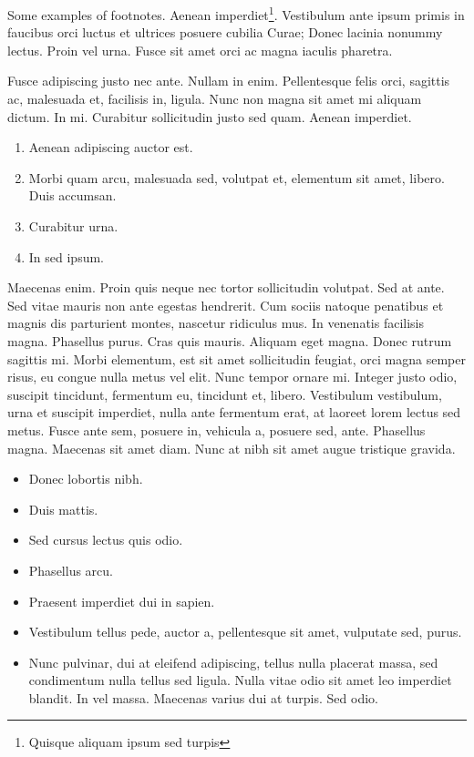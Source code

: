 \documentclass[cfonts,nofontsdir]{nostarch}
\begin{document}
Some examples of footnotes.  Aenean imperdiet\footnote{Quisque aliquam
  ipsum sed turpis}.  Vestibulum ante ipsum pri\-m\-is
in faucibus orci luctus et ultrices posuere cubilia Curae; Donec
lacinia nonummy lectus. Proin vel urna.  Fusce sit amet orci ac magna
iaculis pharetra.

Fusce adipiscing justo nec ante. Nullam in enim.  Pellentesque felis
orci, sagittis ac, malesuada et, facilisis in, ligula.
Nunc non magna sit amet mi aliquam dictum. In mi.
Curabitur sollicitudin justo sed quam. Aenean imperdiet.
\begin{enumerate}
\item Aenean adipiscing auctor est.
\item Morbi quam arcu, malesuada sed, volutpat et, elementum sit
  amet, libero.  Duis accumsan.
\item Curabitur urna.
\item In sed ipsum.
\end{enumerate}

Maecenas enim. Proin quis neque nec tortor
sollicitudin volutpat.  Sed at ante. Sed vitae mauris non
ante egestas hendrerit.  Cum sociis natoque penatibus et magnis dis
parturient montes, nascetur ridiculus mus. In
venenatis facilisis magna. Phasellus
purus. Cras quis mauris.  Aliquam eget magna. Donec rutrum sagittis
mi. Morbi elementum, est sit amet sollicitudin feugiat, orci magna
semper risus, eu congue nulla metus vel elit. Nunc tempor
ornare mi.  Integer justo odio, suscipit tincidunt, fermentum eu,
tincidunt et, libero.  Vestibulum vestibulum, urna et
suscipit imperdiet, nulla ante fermentum erat, at laoreet lorem lectus
sed metus. Fusce ante sem, posuere in, vehicula a, posuere sed, ante.
Phasellus magna.  Maecenas sit amet diam.  Nunc at nibh
sit amet augue tristique gravida.
\begin{itemize}
\item Donec lobortis nibh.
\item Duis mattis.
\item Sed cursus lectus quis odio.
\item Phasellus arcu.
\item Praesent imperdiet dui in sapien.
\item Vestibulum tellus pede, auctor a, pellentesque sit amet, vulputate sed,
  purus.
\item Nunc pulvinar, dui at eleifend adipiscing, tellus
  nulla placerat massa, sed condimentum nulla tellus sed
  ligula. Nulla vitae odio sit amet leo
  imperdiet blandit. In vel massa. Maecenas varius dui at turpis. Sed
  odio.
\end{itemize}
\end{document}
